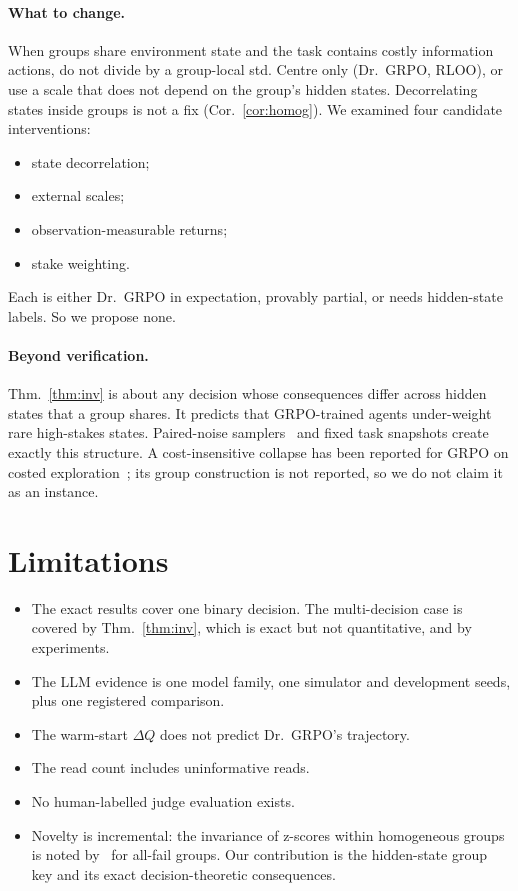 \documentclass[11pt]{article}
\begin{document}
\paragraph{What to change.} When groups share environment state and the task contains costly information actions,
do not divide by a group-local std. Centre only (Dr.~GRPO, RLOO), or use a scale that does not depend on the group's
hidden states. Decorrelating states inside groups is not a fix (Cor.~\ref{cor:homog}). We examined four candidate
interventions:
\begin{itemize}
\item state decorrelation;
\item external scales;
\item observation-measurable returns;
\item stake weighting.
\end{itemize}
Each is either Dr.~GRPO in expectation, provably partial, or needs hidden-state labels. So we propose none.

\paragraph{Beyond verification.} Thm.~\ref{thm:inv} is about any decision whose consequences differ across hidden
states that a group shares. It predicts that GRPO-trained agents under-weight rare high-stakes states. Paired-noise
samplers~\cite{sakib2026luck} and fixed task snapshots create exactly this structure. A cost-insensitive collapse has
been reported for GRPO on costed exploration~\cite{ding2026calibrate}; its group construction is not reported, so we
do not claim it as an instance.

\section*{Limitations}
\begin{itemize}
\item The exact results cover one binary decision. The multi-decision case is covered by Thm.~\ref{thm:inv}, which is
exact but not quantitative, and by experiments.
\item The LLM evidence is one model family, one simulator and development seeds, plus one registered comparison.
\item The warm-start $\Delta Q$ does not predict Dr.~GRPO's trajectory.
\item The read count includes uninformative reads.
\item No human-labelled judge evaluation exists.
\item Novelty is incremental: the invariance of z-scores within homogeneous groups is noted
by~\citet{wang2026darkroom} for all-fail groups. Our contribution is the hidden-state group key and its exact
decision-theoretic consequences.
\end{itemize}
\end{document}
